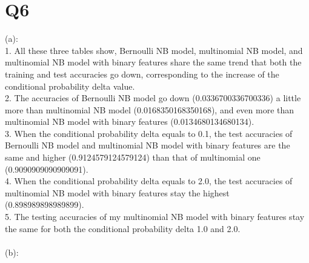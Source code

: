 \documentclass[11pt]{article}
\begin{document}
\section{Q6}
(a): \\
1. All these three tables show, Bernoulli NB model, multinomial NB model, and multinomial NB model with binary features share the same trend that both the training and test accuracies go down, corresponding to the increase of the conditional probability delta value. \\
2. The accuracies of Bernoulli NB model go down (0.0336700336700336) a little more than multinomial NB model (0.0168350168350168), and even more than multinomial NB model with binary features (0.0134680134680134). \\
3. When the conditional probability delta equals to 0.1, the test accuracies of Bernoulli NB model and multinomial NB model with binary features are the same and higher (0.9124579124579124) than that of multinomial one (0.9090909090909091). \\
4. When the conditional probability delta equals to 2.0, the test accuracies of multinomial NB model with binary features stay the highest (0.898989898989899). \\
5. The testing accuracies of my multinomial NB model with binary features stay the same for both the conditional probability delta 1.0 and 2.0. \\ \\
(b): \\
\end{document}
